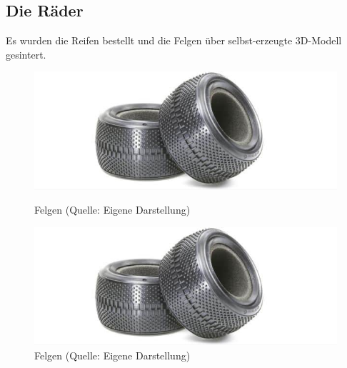 \subsection{Die Räder}
Es wurden die Reifen bestellt und die Felgen über selbst-erzeugte 3D-Modell gesintert.
\begin{figure}[htb]
	\centering
	\begin{minipage}{0.45\linewidth}
		\centering
		\includegraphics[scale=0.5]{images/reifen.png}
		\caption{Felgen \newline (Quelle: Eigene Darstellung)}
	\end{minipage}
	\begin{minipage}{0.45\linewidth}
		\centering
		\includegraphics[scale=0.5]{images/reifen.png}
		\caption{Felgen \newline (Quelle: Eigene Darstellung)}
	\end{minipage}
\end{figure}
